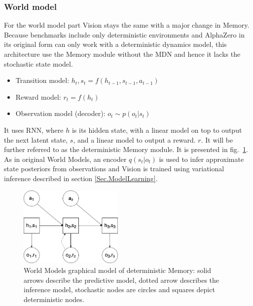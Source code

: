 \subsubsection{World model}

For the world model part Vision stays the same with a major change in Memory. Because benchmarks include only deterministic environments and AlphaZero in its original form can only work with a deterministic dynamics model, this architecture use the Memory module without the MDN and hence it lacks the stochastic state model.
\begin{itemize}
\item Transition model:                      $h_t, s_t = f(h_{t-1}, s_{t-1}, a_{t-1})$
\item Reward model:                          $r_t = f(h_t)$
\item Observation model (decoder):           $o_t \sim p(o_t|s_t)$
\end{itemize}
It uses RNN, where $h$ is its hidden state, with a linear model on top to output the next latent state, $s$, and a linear model to output a reward. $r$. It will be further referred to as the deterministic Memory module. It is presented in fig.~\ref{Fig.WorldModelsPGMDet}. \\
As in original World Models, an encoder $q(s_t | o_t)$ is used to infer approximate state posteriors from observations and Vision is trained using variational inference described in section \ref{Sec.ModelLearning}.

\begin{figure}[H]
\includegraphics[width=0.45\textwidth,keepaspectratio]{figures/WorldModels/prob_graph_model_det.png}
\caption[World Models graphical model of deterministic Memory]{World Models graphical model of deterministic Memory: solid arrows describe the predictive model, dotted arrow describes the inference model, stochastic nodes are circles and squares depict deterministic nodes.}
\label{Fig.WorldModelsPGMDet}
\end{figure}

